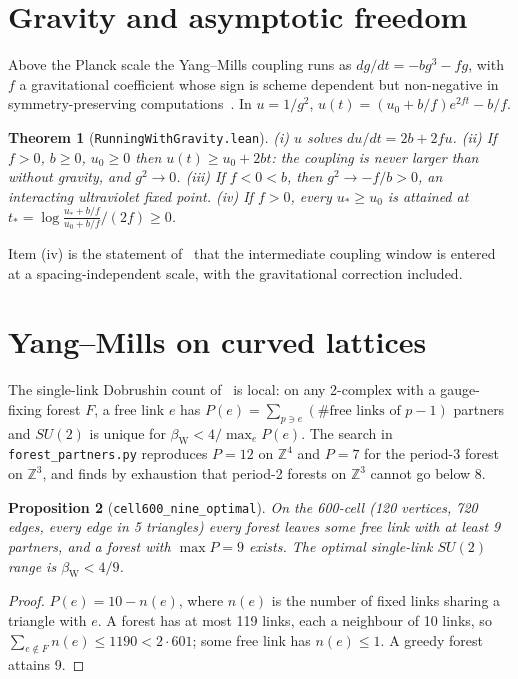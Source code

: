 \documentclass[aps,prd,twocolumn,superscriptaddress,nofootinbib]{revtex4-2}
\newtheorem{theorem}{Theorem}
\newtheorem{proposition}[theorem]{Proposition}
\theoremstyle{remark}
\newcommand{\bW}{\beta_{\mathrm W}}
\newcommand{\Z}{\mathbb{Z}}
\begin{document}
\section{Gravity and asymptotic freedom}

Above the Planck scale the Yang--Mills coupling runs as $dg/dt=-bg^3-fg$, with $f$ a gravitational coefficient
whose sign is scheme dependent but non-negative in symmetry-preserving computations~\cite{FLP}. In $u=1/g^2$,
$u(t)=(u_0+b/f)e^{2ft}-b/f$.

\begin{theorem}[\texttt{RunningWithGravity.lean}]
(i) $u$ solves $du/dt=2b+2fu$. (ii) If $f>0$, $b\ge0$, $u_0\ge0$ then $u(t)\ge u_0+2bt$: the coupling is never larger
than without gravity, and $g^2\to0$. (iii) If $f<0<b$, then $g^2\to-f/b>0$, an interacting ultraviolet fixed point.
(iv) If $f>0$, every $u_*\ge u_0$ is attained at $t_*=\log\frac{u_*+b/f}{u_0+b/f}/(2f)\ge0$.
\end{theorem}

Item (iv) is the statement of~\cite{4YM} that the intermediate coupling window is entered at a spacing-independent
scale, with the gravitational correction included.

\section{Yang--Mills on curved lattices}

The single-link Dobrushin count of~\cite{4YM} is local: on any 2-complex with a gauge-fixing forest $F$, a free link
$e$ has $P(e)=\sum_{p\ni e}(\#\text{free links of }p-1)$ partners and $SU(2)$ is unique for $\bW<4/\max_eP(e)$. The
search in \texttt{forest\_partners.py} reproduces $P=12$ on $\Z^4$ and $P=7$ for the period-3 forest on $\Z^3$, and
finds by exhaustion that period-2 forests on $\Z^3$ cannot go below 8.

\begin{proposition}[\texttt{cell600\_nine\_optimal}]
On the 600-cell (120 vertices, 720 edges, every edge in 5 triangles) every forest leaves some free link with at least
9 partners, and a forest with $\max P=9$ exists. The optimal single-link $SU(2)$ range is $\bW<4/9$.
\end{proposition}

\begin{proof}
$P(e)=10-n(e)$, where $n(e)$ is the number of fixed links sharing a triangle with $e$. A forest has at most 119
links, each a neighbour of 10 links, so $\sum_{e\notin F}n(e)\le1190<2\cdot601$; some free link has $n(e)\le1$.
A greedy forest attains 9.
\end{proof}
\end{document}
